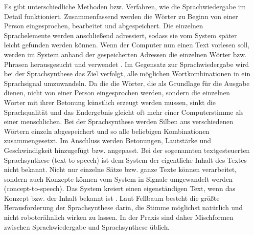 \newline \newline
Es gibt unterschiedliche Methoden bzw. Verfahren, wie die Sprachwiedergabe im Detail funktioniert. Zusammenfassend werden die Wörter zu Beginn von einer Person eingesprochen, bearbeitet und abgespeichert. Die einzelnen Sprachelemente werden anschließend adressiert, sodass sie vom System später leicht gefunden werden können. Wenn der Computer nun einen Text vorlesen soll, werden im System anhand der gespeicherten Adressen die einzelnen Wörter bzw. Phrasen herausgesucht und verwendet \cite{FellbaumSprache}.
\newline \newline
Im Gegensatz zur Sprachwiedergabe wird bei der Sprachsynthese das Ziel verfolgt, alle möglichen Wortkombinationen in ein Sprachsignal umzuwandeln. Da die die Wörter, die als Grundlage für die Ausgabe dienen, nicht von einer Person eingesprochen werden, sondern die einzelnen Wörter mit ihrer Betonung künstlich erzeugt werden müssen, sinkt die Sprachqualität und das Endergebnis gleicht oft mehr einer Computerstimme als einer menschlichen. 
\newline \newline
Bei der Sprachsynthese werden Silben aus verschiedenen Wörtern einzeln abgespeichert und so alle beliebigen Kombinationen zusammengesetzt. Im Anschluss werden Betonungen, Lautstärke und Geschwindigkeit hinzugefügt bzw. angepasst. Bei der sogenannten textgesteuerten Sprachsynthese (text-to-speech) ist dem System der eigentliche Inhalt des Textes nicht bekannt. Nicht nur einzelne Sätze bzw. ganze Texte können verarbeitet, sondern auch Konzepte können vom System in Signale umgewandelt werden (concept-to-speech). Das System kreiert einen eigenständigen Text, wenn das Konzept bzw. der Inhalt bekannt ist \cite{FellbaumSprache}.
\newline \newline
Laut Fellbaum \cite{FellbaumSprache} besteht die größte Herausforderung der Sprachsynthese darin, die Stimme möglichst natürlich und nicht roboterähnlich wirken zu lassen. In der Praxis sind daher Mischformen zwischen Sprachwiedergabe und Sprachsynthese üblich. 


